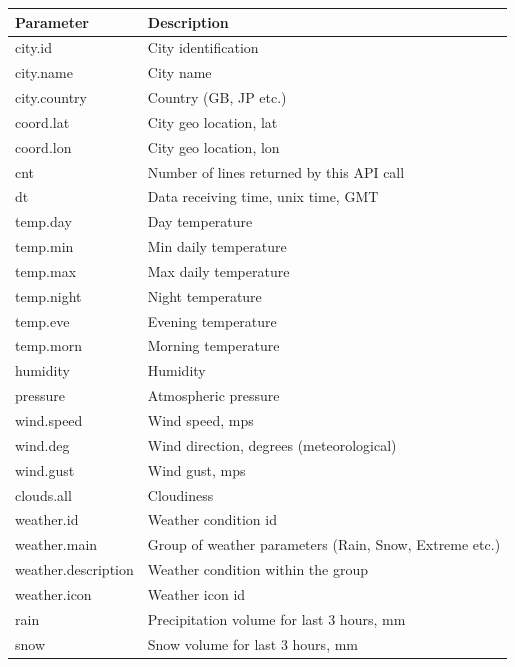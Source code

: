\documentclass[paper=a4, fontsize=11pt]{article} %
\numberwithin{equation}{section} %
\numberwithin{figure}{section} %
\numberwithin{table}{section} %
\begin{document}
\begin{center}
    \begin{tabular}{ | l | p{5cm} |}
    \hline
    \textbf{Parameter} & \textbf{Description} \\ \hline
    city.id & City identification \\ \hline
    city.name & City name \\ \hline
    city.country & Country (GB, JP etc.) \\ \hline
    
    coord.lat & City geo location, lat \\ \hline
    coord.lon & City geo location, lon \\ \hline
    
    cnt & Number of lines returned by this API call \\ \hline
    dt & Data receiving time, unix time, GMT \\ \hline
    temp.day & Day temperature \\ \hline
    temp.min & Min daily temperature \\ \hline
    temp.max & Max daily temperature \\ \hline
    temp.night & Night temperature \\ \hline
    temp.eve & Evening temperature \\ \hline
    temp.morn & Morning temperature \\ \hline
    humidity & Humidity \\ \hline
    pressure & Atmospheric pressure \\ \hline
    wind.speed & Wind speed, mps \\ \hline
    wind.deg & Wind direction, degrees (meteorological) \\ \hline
    wind.gust & Wind gust, mps \\ \hline
    clouds.all & Cloudiness \\ \hline
    weather.id & Weather condition id \\ \hline
    weather.main & Group of weather parameters (Rain, Snow, Extreme etc.) \\ \hline
    weather.description & Weather condition within the group \\ \hline
    weather.icon & Weather icon id \\ \hline
    rain & Precipitation volume for last 3 hours, mm \\ \hline
    snow & Snow volume for last 3 hours, mm \\ \hline
    \end{tabular}
\end{center}
\end{document}
